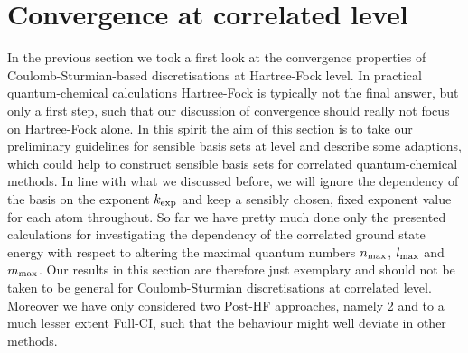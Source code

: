 \section{Convergence at correlated level}


In the previous section we took a first look at the convergence
properties of Coulomb-Sturmian-based discretisations at Hartree-Fock level.
In practical quantum-chemical calculations Hartree-Fock is typically
not the final answer,
but only a first step,
such that our discussion of convergence should really not focus on Hartree-Fock alone.
In this spirit the aim of this section is to take our preliminary guidelines
for sensible basis sets at \HF level and describe some adaptions,
which could help to construct sensible \CS basis sets for correlated
quantum-chemical methods.
In line with what we discussed before, we will ignore the dependency
of the \CS basis on the exponent $k_\text{exp}$ and keep a sensibly chosen,
fixed exponent value for each atom throughout.
So far we have pretty much done only the presented calculations
for investigating the dependency of the correlated ground state energy
with respect to altering the maximal quantum numbers $n_\text{max}$, $l_\text{max}$ and $m_\text{max}$.
Our results in this section are therefore just exemplary
and should not be taken to be general for Coulomb-Sturmian discretisations
at correlated level.
Moreover we have only considered two Post-HF approaches,
namely {\MP}2 and to a much lesser extent Full-CI,
such that the behaviour might well deviate in other methods.

